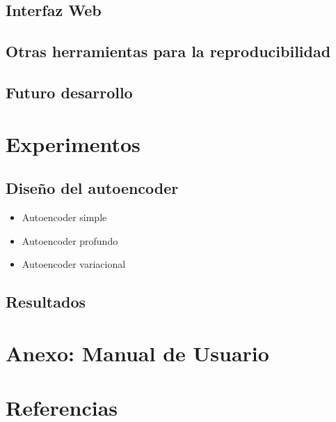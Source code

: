 \documentclass[
  12pt,
  a4paperpaper,
]{report}
\providecommand{\tightlist}{%
  \setlength{\itemsep}{0pt}\setlength{\parskip}{0pt}}
\begin{document}
\hypertarget{interfaz-web}{%
\section{Interfaz Web}\label{interfaz-web}}

\hypertarget{otras-herramientas-para-la-reproducibilidad}{%
\section{Otras herramientas para la
reproducibilidad}\label{otras-herramientas-para-la-reproducibilidad}}

\hypertarget{futuro-desarrollo}{%
\section{Futuro desarrollo}\label{futuro-desarrollo}}

\hypertarget{experimentos}{%
\chapter{Experimentos}\label{experimentos}}

\hypertarget{diseuxf1o-del-autoencoder}{%
\section{Diseño del autoencoder}\label{diseuxf1o-del-autoencoder}}

\begin{itemize}
\tightlist
\item
  Autoencoder simple
\item
  Autoencoder profundo
\item
  Autoencoder variacional
\end{itemize}

\hypertarget{resultados}{%
\section{Resultados}\label{resultados}}

\hypertarget{anexo-manual-de-usuario}{%
\chapter{Anexo: Manual de Usuario}\label{anexo-manual-de-usuario}}

\footnotesize

\hypertarget{referencias}{%
\chapter{Referencias}\label{referencias}}
\end{document}
